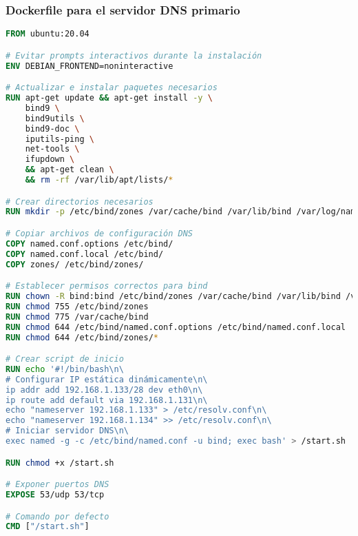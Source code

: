 \subsubsection{Dockerfile para el servidor DNS primario}
\label{Apendice2:dockerfile_dns_primario}
\begin{lstlisting}[language=Dockerfile]
FROM ubuntu:20.04

# Evitar prompts interactivos durante la instalación
ENV DEBIAN_FRONTEND=noninteractive

# Actualizar e instalar paquetes necesarios
RUN apt-get update && apt-get install -y \
    bind9 \
    bind9utils \
    bind9-doc \
    iputils-ping \
    net-tools \
    ifupdown \
    && apt-get clean \
    && rm -rf /var/lib/apt/lists/*

# Crear directorios necesarios
RUN mkdir -p /etc/bind/zones /var/cache/bind /var/lib/bind /var/log/named

# Copiar archivos de configuración DNS
COPY named.conf.options /etc/bind/
COPY named.conf.local /etc/bind/
COPY zones/ /etc/bind/zones/

# Establecer permisos correctos para bind
RUN chown -R bind:bind /etc/bind/zones /var/cache/bind /var/lib/bind /var/log/named
RUN chmod 755 /etc/bind/zones
RUN chmod 775 /var/cache/bind
RUN chmod 644 /etc/bind/named.conf.options /etc/bind/named.conf.local
RUN chmod 644 /etc/bind/zones/*

# Crear script de inicio
RUN echo '#!/bin/bash\n\
# Configurar IP estática dinámicamente\n\
ip addr add 192.168.1.133/28 dev eth0\n\
ip route add default via 192.168.1.131\n\
echo "nameserver 192.168.1.133" > /etc/resolv.conf\n\
echo "nameserver 192.168.1.134" >> /etc/resolv.conf\n\
# Iniciar servidor DNS\n\
exec named -g -c /etc/bind/named.conf -u bind; exec bash' > /start.sh

RUN chmod +x /start.sh

# Exponer puertos DNS
EXPOSE 53/udp 53/tcp

# Comando por defecto
CMD ["/start.sh"] 
\end{lstlisting}


